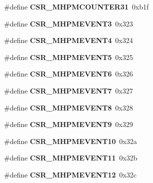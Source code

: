 \begin{DoxyCompactItemize}
\#define {\bfseries C\+S\+R\+\_\+\+M\+H\+P\+M\+C\+O\+U\+N\+T\+E\+R31}~0xb1f
\item 
\mbox{\label{riscv-utility_8h_a5c0638be852bb8fe266552e903e5d086}} 
\#define {\bfseries C\+S\+R\+\_\+\+M\+H\+P\+M\+E\+V\+E\+N\+T3}~0x323
\item 
\mbox{\label{riscv-utility_8h_a938f602cf4785d7063da6c853c051c78}} 
\#define {\bfseries C\+S\+R\+\_\+\+M\+H\+P\+M\+E\+V\+E\+N\+T4}~0x324
\item 
\mbox{\label{riscv-utility_8h_a15162dd8d541a809e6fbeef1ed01d09a}} 
\#define {\bfseries C\+S\+R\+\_\+\+M\+H\+P\+M\+E\+V\+E\+N\+T5}~0x325
\item 
\mbox{\label{riscv-utility_8h_a0185093eb5946c8137708e21916dc65e}} 
\#define {\bfseries C\+S\+R\+\_\+\+M\+H\+P\+M\+E\+V\+E\+N\+T6}~0x326
\item 
\mbox{\label{riscv-utility_8h_aacfba0d92c494d8e83a7e13f183ebf2f}} 
\#define {\bfseries C\+S\+R\+\_\+\+M\+H\+P\+M\+E\+V\+E\+N\+T7}~0x327
\item 
\mbox{\label{riscv-utility_8h_aa64bbdd12c51cc1bba742dac6dc4fd59}} 
\#define {\bfseries C\+S\+R\+\_\+\+M\+H\+P\+M\+E\+V\+E\+N\+T8}~0x328
\item 
\mbox{\label{riscv-utility_8h_a177a9b634120f0f0eb54e0469970d9c4}} 
\#define {\bfseries C\+S\+R\+\_\+\+M\+H\+P\+M\+E\+V\+E\+N\+T9}~0x329
\item 
\mbox{\label{riscv-utility_8h_af45e26868117973a085e36d7eff5450e}} 
\#define {\bfseries C\+S\+R\+\_\+\+M\+H\+P\+M\+E\+V\+E\+N\+T10}~0x32a
\item 
\mbox{\label{riscv-utility_8h_a92f0189e5bd365e0841d4e940873bb0e}} 
\#define {\bfseries C\+S\+R\+\_\+\+M\+H\+P\+M\+E\+V\+E\+N\+T11}~0x32b
\item 
\mbox{\label{riscv-utility_8h_ac3be9181730b41f7569d3a02c0678476}} 
\#define {\bfseries C\+S\+R\+\_\+\+M\+H\+P\+M\+E\+V\+E\+N\+T12}~0x32c
\item 
\mbox{\label{riscv-utility_8h_a1bdcead9d6986e83ca841b77f1415221}} 

\end{DoxyCompactItemize}

